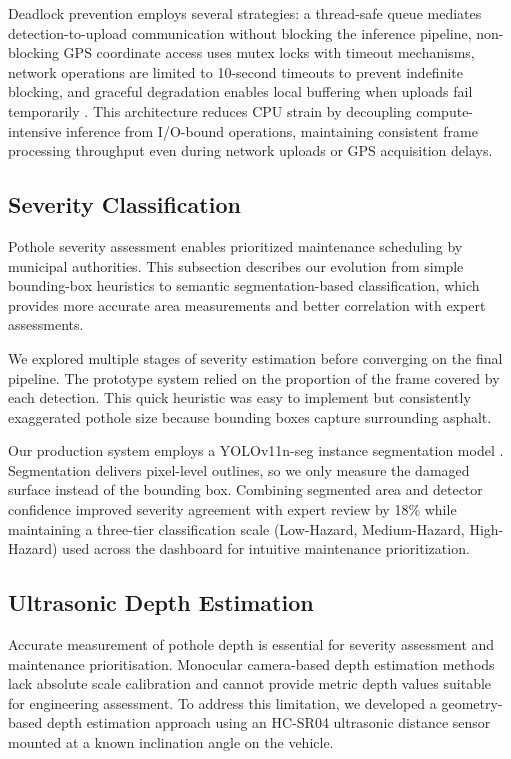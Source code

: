 \documentclass{ieeeaccess}
\begin{document}
Deadlock prevention employs several strategies: a thread-safe queue mediates detection-to-upload communication without blocking the inference pipeline, non-blocking GPS coordinate access uses mutex locks with timeout mechanisms, network operations are limited to 10-second timeouts to prevent indefinite blocking, and graceful degradation enables local buffering when uploads fail temporarily \cite{b9}. This architecture reduces CPU strain by decoupling compute-intensive inference from I/O-bound operations, maintaining consistent frame processing throughput even during network uploads or GPS acquisition delays.

\subsection{Severity Classification}

Pothole severity assessment enables prioritized maintenance scheduling by municipal authorities. This subsection describes our evolution from simple bounding-box heuristics to semantic segmentation-based classification, which provides more accurate area measurements and better correlation with expert assessments.

We explored multiple stages of severity estimation before converging on the final pipeline. The prototype system relied on the proportion of the frame covered by each detection. This quick heuristic was easy to implement but consistently exaggerated pothole size because bounding boxes capture surrounding asphalt.

Our production system employs a YOLOv11n-seg instance segmentation model \cite{b5}. Segmentation delivers pixel-level outlines, so we only measure the damaged surface instead of the bounding box. Combining segmented area and detector confidence improved severity agreement with expert review by 18\% while maintaining a three-tier classification scale (Low-Hazard, Medium-Hazard, High-Hazard) used across the dashboard for intuitive maintenance prioritization.

\subsection{Ultrasonic Depth Estimation}
\label{sec:depth_estimation}

Accurate measurement of pothole depth is essential for severity assessment and maintenance prioritisation. Monocular camera-based depth estimation methods lack absolute scale calibration and cannot provide metric depth values suitable for engineering assessment. To address this limitation, we developed a geometry-based depth estimation approach using an HC-SR04 ultrasonic distance sensor mounted at a known inclination angle on the vehicle.
\end{document}
